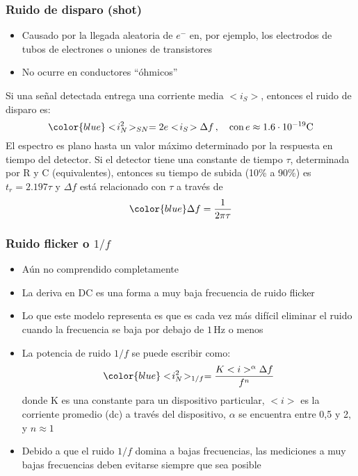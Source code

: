 \documentclass{beamer}
\begin{document}
\begin{frame}
\frametitle{Ruido de disparo (shot)}
\begin{alertblock}{}
\begin{itemize}
\item Causado por la llegada aleatoria de $e^-$ en, por ejemplo, los electrodos
de tubos de electrones o uniones de transistores

\item No ocurre en conductores ``\'ohmicos''
\end{itemize}
\end{alertblock}
Si una señal detectada entrega una corriente media $<\!i_S\!>$, entonces el
ruido de disparo es:
$${\color{blue}<\!i_N^2\!>_{SN} = 2e<\!i_S\!>\Delta f}\,, \quad \text{con}\, e \approx
1.6\cdot10^{-19}\text{C}$$
El espectro es plano hasta un valor m\'aximo determinado por la respuesta en
tiempo del detector. Si el detector tiene una constante de tiempo $\tau$,
determinada por R y C (equivalentes), entonces su tiempo de subida (10\% a 90\%) es $t_r =
2.197\tau$ y $\Delta f$ est\'a relacionado con $\tau$ a trav\'es de 
$${\color{blue}\Delta f = \frac{1}{2\pi\tau}}$$
\end{frame} 

\begin{frame}
\frametitle{Ruido flicker o $1/f$}
\begin{block}{}
\begin{itemize}
\item A\'un no comprendido completamente
\item La deriva en DC es una forma a muy baja frecuencia de ruido flicker
\item Lo que este modelo representa es que es cada vez m\'as dif\'icil eliminar el
ruido cuando la frecuencia se baja por debajo de $1\,\text{Hz}$ o menos
\item La potencia de ruido $1/f$ se puede escribir como:
$${\color{blue}<\!i_N^2\!>_{1/f} = \frac{K<i>^\alpha\Delta f}{f^n}}$$
donde K es una constante para un dispositivo particular, $<\!i\!>$ es la
corriente promedio (dc) a trav\'es del dispositivo, $\alpha$ se encuentra entre
0,5 y 2, y $n \approx 1$
\item Debido a que el ruido $1/f$ domina a bajas frecuencias, las mediciones a muy
bajas frecuencias deben evitarse siempre que sea posible
\end{itemize}
\end{block}
\end{frame} 
\end{document}
